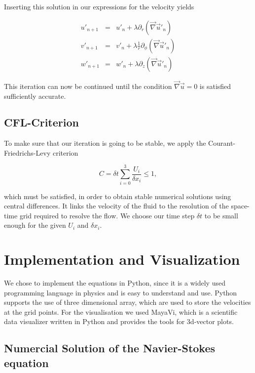 \documentclass[12pt, a4paper]{article} %
\begin{document}
		Inserting this solution in our expressions for the velocity yields
		
		\begin{eqnarray}
			u'_{n+1} &=& u'_n + \lambda \partial_r (\vec{\nabla}\vec{u}'_n) \\
			v'_{n+1} &=& v'_n + \lambda \frac{1}{r} \partial_\phi (\vec{\nabla}\vec{u}'_n) \\
			w'_{n+1} &=& w'_n + \lambda \partial_z (\vec{\nabla}\vec{u}'_n)
			\label{eq:Drucknachregelung uvw}
		\end{eqnarray}
		
		This iteration can now be continued until the condition $\vec{\nabla}\vec{u}=0$ is satisfied sufficiently accurate. 
	
	\subsection{CFL-Criterion} %
		To make sure that our iteration is going to be stable, we apply the Courant-Friedrichs-Levy criterion
		
		\begin{equation}
			C = \delta t \sum_{i=0}^3 \frac{U_i}{\delta x_i} \leq 1 ,
			\label{eq:CFL}
		\end{equation}
		 
		which must be satisfied, in order to obtain stable numerical solutions using central differences. It links the velocity of the fluid to the resolution of the space-time grid required to resolve the flow. \cite{Stocker2009}
		We choose our time step $\delta t$ to be small enough for the given $U_i$ and $\delta x_i$.
		
		
	\newpage
\section{Implementation and Visualization}

	We chose to implement the equations in Python, since it is a widely used programming language in physics and is easy to understand and use. Python supports the use of three dimensional array, which are used to store the velocities at the grid points. For the visualisation we used MayaVi, which is a scientific data visualizer written in Python and provides the tools for 3d-vector plots.

	\subsection{Numercial Solution of the Navier-Stokes equation}
		
\end{document}
